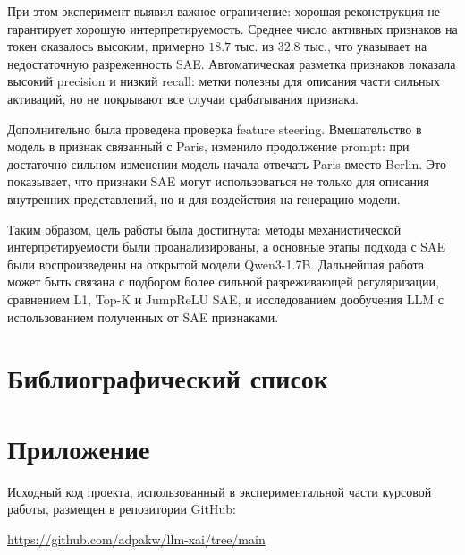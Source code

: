 \documentclass[a4paper,14pt]{extreport}
\begin{document}
При этом эксперимент выявил важное ограничение: хорошая реконструкция не
гарантирует хорошую интерпретируемость. Среднее число активных признаков на
токен оказалось высоким, примерно $18.7$ тыс. из $32.8$ тыс., что указывает на
недостаточную разреженность SAE. Автоматическая разметка признаков показала
высокий precision и низкий recall: метки полезны для описания части сильных
активаций, но не покрывают все случаи срабатывания признака.

Дополнительно была проведена проверка feature steering. Вмешательство
в модель в признак связанный с Paris, изменило продолжение prompt: при
достаточно сильном изменении модель начала отвечать Paris вместо Berlin. Это
показывает, что признаки SAE могут использоваться не только для описания
внутренних представлений, но и для воздействия на генерацию модели.

Таким образом, цель работы была достигнута: методы механистической
интерпретируемости были проанализированы, а основные этапы подхода с SAE были
воспроизведены на открытой модели Qwen3-1.7B. Дальнейшая работа может быть
связана с подбором более сильной разреживающей регуляризации, сравнением L1,
Top-K и JumpReLU SAE, и исследованием дообучения LLM с использованием полученных от SAE признаками.

\chapter*{Библиографический список}
\printbibliography[heading=none]

\chapter*{Приложение}

Исходный код проекта, использованный в экспериментальной части курсовой работы,
размещен в репозитории GitHub:

\begin{center}
    \url{https://github.com/adpakw/llm-xai/tree/main}
\end{center}
\end{document}
